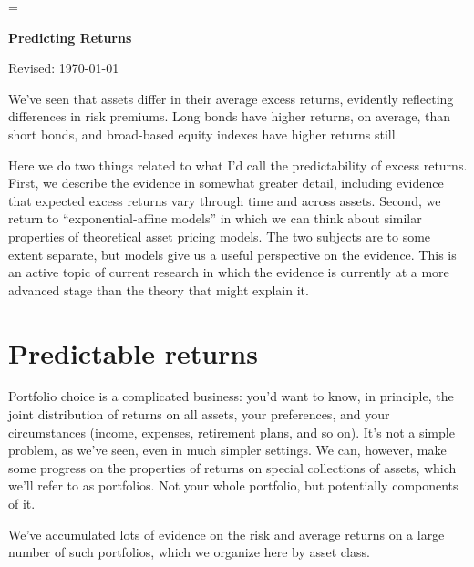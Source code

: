 \documentclass[11pt]{article}
\begin{document}
\parskip=\bigskipamount
\parindent=0.0in
\thispagestyle{empty}


\bigskip\bigskip
\centerline{\Large \bf Predicting Returns}
\centerline{Revised: \today}

\begin{comment}
Can we convert bond models to returns? 

\end{comment} 

\bigskip
We've seen that assets differ in their average excess returns,
evidently reflecting differences in risk premiums.
Long bonds have higher returns, on average, than short bonds,
and broad-based equity indexes have higher returns still.

Here we do two things related to what I'd call the predictability of
excess returns.  First, we describe the evidence in somewhat greater detail,
including evidence that expected excess returns vary through time and across assets.
Second, we return to ``exponential-affine models'' in which we can think
about similar properties of theoretical asset pricing models.
The two subjects are to some extent separate,
but models give us a useful perspective on the evidence.
This is an active topic of current research in which
the evidence is currently at a more advanced stage than the theory that might explain it.


\section{Predictable returns}

Portfolio choice is a complicated business:  you'd want to know,
in principle, the joint distribution of returns on all assets,
your preferences, and your circumstances (income, expenses, retirement plans, and so on).
It's not a simple problem, as we've seen, even in much simpler settings.
We can, however, make some progress on the properties of returns
on special collections of assets, which we'll refer to as portfolios.
Not your whole portfolio, but potentially components of it.

We've accumulated lots of evidence on the risk and average returns
on a large number of such portfolios, which we organize here by asset class.
\end{document}
